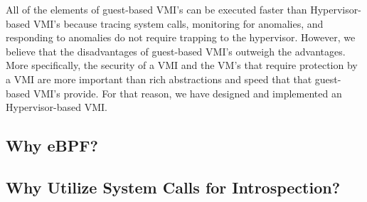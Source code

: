 \documentclass{report}
\begin{document}
\begin{spacing}{1.5}
{\large
All of the elements of guest-based VMI's can be executed faster than Hypervisor-based VMI's because tracing system calls, monitoring for anomalies, and responding to anomalies do not require trapping to the hypervisor. However, we believe that the disadvantages of guest-based VMI's outweigh the advantages. More specifically, the security of a VMI and the VM's that require protection by a VMI are more important than rich abstractions and speed that that guest-based VMI's provide. For that reason, we have designed and implemented an Hypervisor-based VMI.
\newline
}














\subsection{Why eBPF?}















\subsection{Why Utilize System Calls for Introspection?}


\end{spacing}
\end{document}

